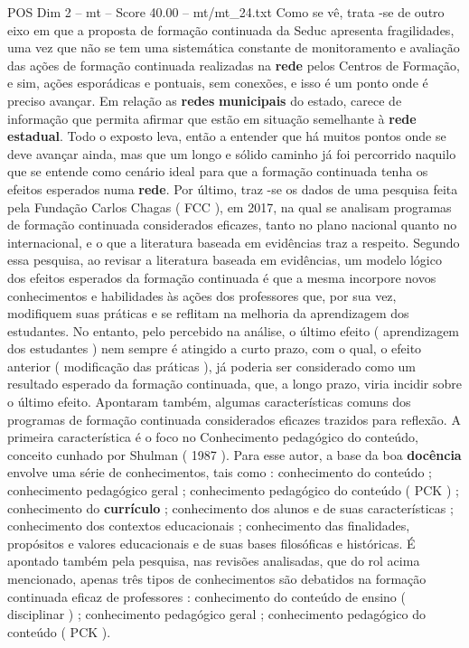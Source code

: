 \begin{textsample}{POS Dim 2 – mt – Score 40.00 – mt/mt\_24.txt}
Como se vê, trata -se de outro eixo em que a proposta de formação continuada da Seduc apresenta fragilidades, uma vez que não se tem uma sistemática constante de monitoramento e avaliação das ações de formação continuada realizadas na \textbf{rede} pelos Centros de Formação, e sim, ações esporádicas e pontuais, sem conexões, e isso é um ponto onde é preciso avançar.
Em relação as \textbf{redes} \textbf{municipais} do estado, carece de informação que permita afirmar que estão em situação semelhante à \textbf{rede} \textbf{estadual}.
Todo o exposto leva, então a entender que há muitos pontos onde se deve avançar ainda, mas que um longo e sólido caminho já foi percorrido naquilo que se entende como cenário ideal para que a formação continuada tenha os efeitos esperados numa \textbf{rede}.
Por último, traz -se os dados de uma pesquisa feita pela Fundação Carlos Chagas ( FCC ), em 2017, na qual se analisam programas de formação continuada considerados eficazes, tanto no plano nacional quanto no internacional, e o que a literatura baseada em evidências traz a respeito.
Segundo essa pesquisa, ao revisar a literatura baseada em evidências, um modelo lógico dos efeitos esperados da formação continuada é que a mesma incorpore novos conhecimentos e habilidades às ações dos professores que, por sua vez, modifiquem suas práticas e se reflitam na melhoria da aprendizagem dos estudantes.
No entanto, pelo percebido na análise, o último efeito ( aprendizagem dos estudantes ) nem sempre é atingido a curto prazo, com o qual, o efeito anterior ( modificação das práticas ), já poderia ser considerado como um resultado esperado da formação continuada, que, a longo prazo, viria incidir sobre o último efeito.
Apontaram também, algumas características comuns dos programas de formação continuada considerados eficazes trazidos para reflexão.
A primeira característica é o foco no Conhecimento pedagógico do conteúdo, conceito cunhado por Shulman ( 1987 ).
Para esse autor, a base da boa \textbf{docência} envolve uma série de conhecimentos, tais como : conhecimento do conteúdo ; conhecimento pedagógico geral ; conhecimento pedagógico do conteúdo ( PCK ) ; conhecimento do \textbf{currículo} ; conhecimento dos alunos e de suas características ; conhecimento dos contextos educacionais ; conhecimento das finalidades, propósitos e valores educacionais e de suas bases filosóficas e históricas.
É apontado também pela pesquisa, nas revisões analisadas, que do rol acima mencionado, apenas três tipos de conhecimentos são debatidos na formação continuada eficaz de professores : conhecimento do conteúdo de ensino ( disciplinar ) ; conhecimento pedagógico geral ; conhecimento pedagógico do conteúdo ( PCK ).

\end{textsample}
